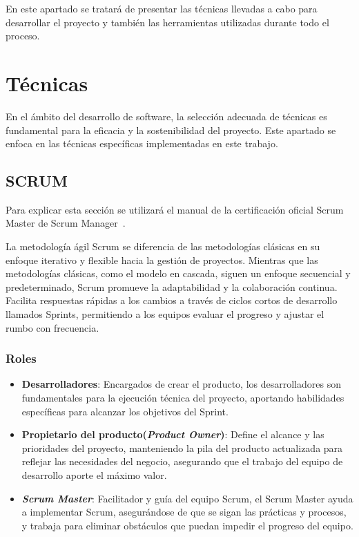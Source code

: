 
En este apartado se tratará de presentar las técnicas llevadas a cabo para desarrollar el proyecto y también las herramientas utilizadas durante todo el proceso.
\section{Técnicas}
En el ámbito del desarrollo de software, la selección adecuada de técnicas es fundamental para la eficacia y la sostenibilidad del proyecto. Este apartado se enfoca en las técnicas específicas implementadas en este trabajo.
\subsection{SCRUM}
Para explicar esta sección se utilizará el manual de la certificación oficial Scrum Master de Scrum Manager~\cite{SCRUM}.


La metodología ágil Scrum se diferencia de las metodologías clásicas en su enfoque iterativo y flexible hacia la gestión de proyectos. Mientras que las metodologías clásicas, como el modelo en cascada, siguen un enfoque secuencial y predeterminado, Scrum promueve la adaptabilidad y la colaboración continua. Facilita respuestas rápidas a los cambios a través de ciclos cortos de desarrollo llamados Sprints, permitiendo a los equipos evaluar el progreso y ajustar el rumbo con frecuencia.
\subsubsection{Roles}
\begin{itemize}
	\item \textbf{Desarrolladores}: Encargados de crear el producto, los desarrolladores son fundamentales para la ejecución técnica del proyecto, aportando habilidades específicas para alcanzar los objetivos del Sprint.
	\item \textbf{Propietario del producto(\textit{Product Owner})}: Define el alcance y las prioridades del proyecto, manteniendo la pila del producto actualizada para reflejar las necesidades del negocio, asegurando que el trabajo del equipo de desarrollo aporte el máximo valor.
	\item \textbf{\textit{Scrum Master}}: Facilitador y guía del equipo Scrum, el Scrum Master ayuda a implementar Scrum, asegurándose de que se sigan las prácticas y procesos, y trabaja para eliminar obstáculos que puedan impedir el progreso del equipo.
\end{itemize}
